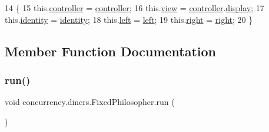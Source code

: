 \begin{DoxyCode}
14                                                                              \{
15         this.\mbox{\hyperlink{classconcurrency_1_1diners_1_1_fixed_philosopher_a909154a6fbb8a9edde312f68d3198c9d}{controller}} = \mbox{\hyperlink{classconcurrency_1_1diners_1_1_fixed_philosopher_a909154a6fbb8a9edde312f68d3198c9d}{controller}};
16         this.\mbox{\hyperlink{classconcurrency_1_1diners_1_1_fixed_philosopher_af5da1a5ec888567bf35bad38b07ff28f}{view}} = \mbox{\hyperlink{classconcurrency_1_1diners_1_1_fixed_philosopher_a909154a6fbb8a9edde312f68d3198c9d}{controller}}.\mbox{\hyperlink{classconcurrency_1_1diners_1_1_diners_a89ca881884065b1e357a0556bb1be1fe}{display}};
17         this.\mbox{\hyperlink{classconcurrency_1_1diners_1_1_fixed_philosopher_a13bd397cacaca012e3895178f7a2de94}{identity}} = \mbox{\hyperlink{classconcurrency_1_1diners_1_1_fixed_philosopher_a13bd397cacaca012e3895178f7a2de94}{identity}};
18         this.\mbox{\hyperlink{classconcurrency_1_1diners_1_1_fixed_philosopher_a1497025833df648aff2d8ede353aa78e}{left}} = \mbox{\hyperlink{classconcurrency_1_1diners_1_1_fixed_philosopher_a1497025833df648aff2d8ede353aa78e}{left}};
19         this.\mbox{\hyperlink{classconcurrency_1_1diners_1_1_fixed_philosopher_acb8d793707783eb15a614bd2d8c0abc3}{right}} = \mbox{\hyperlink{classconcurrency_1_1diners_1_1_fixed_philosopher_acb8d793707783eb15a614bd2d8c0abc3}{right}};
20     \}
\end{DoxyCode}


\subsection{Member Function Documentation}
\mbox{\label{classconcurrency_1_1diners_1_1_fixed_philosopher_ac59ca3a6e64e739ba09100994844121b}} 
\subsubsection{\texorpdfstring{run()}{run()}}
{\footnotesize\ttfamily void concurrency.\+diners.\+Fixed\+Philosopher.\+run (\begin{DoxyParamCaption}{ }\end{DoxyParamCaption})\hspace{0.3cm}{\ttfamily [inline]}}


